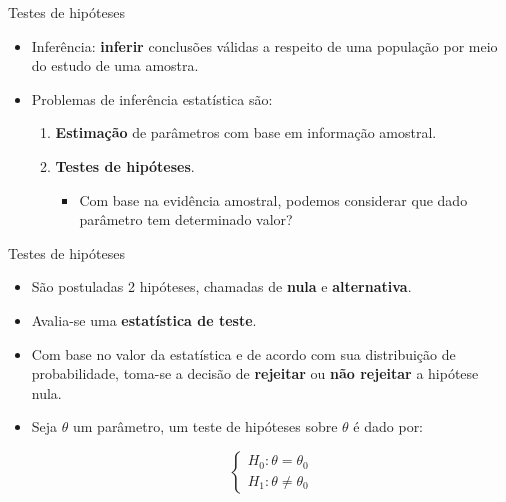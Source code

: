 \documentclass[
  ignorenonframetext,
  serif,
  professionalfont,
  usenames,
  dvipsnames,
  aspectratio = 169]{beamer}
\begin{document}
\begin{frame}{Testes de hipóteses}
\protect\hypertarget{testes-de-hipuxf3teses-1}{}
\begin{itemize}
    \itemsep 2ex
  
  \item Inferência: \textbf{inferir} conclusões válidas a respeito de uma população por meio do estudo de uma amostra.
  
  \item Problemas de inferência estatística são:
    \begin{enumerate}
    
      \itemsep 2ex
      
      \item \textbf{Estimação} de parâmetros com base em informação amostral.
      
      \item \textbf{Testes de hipóteses}.
        \begin{itemize}
          \item Com base na evidência amostral, podemos considerar que dado parâmetro tem determinado valor?
        \end{itemize}
    
    \end{enumerate}
  
  \end{itemize}
\end{frame}

\begin{frame}{Testes de hipóteses}
\protect\hypertarget{testes-de-hipuxf3teses-2}{}
\begin{itemize}
    \itemsep 2ex
  
  \item São postuladas 2 hipóteses, chamadas de \textbf{nula} e \textbf{alternativa}.
  
  \item Avalia-se uma \textbf{estatística de teste}.
  
  \item Com base no valor da estatística e de acordo com sua distribuição de probabilidade, toma-se a decisão de \textbf{rejeitar} ou \textbf{não rejeitar} a hipótese nula.
    
  \item Seja $\theta$ um parâmetro, um teste de hipóteses sobre $\theta$ é dado por:
  
$$
\left\{\begin{matrix}
H_0: \theta = \theta_0 \\ 
H_1: \theta \neq \theta_0
\end{matrix}\right.
$$  
  
  \end{itemize}
\end{frame}
\end{document}
